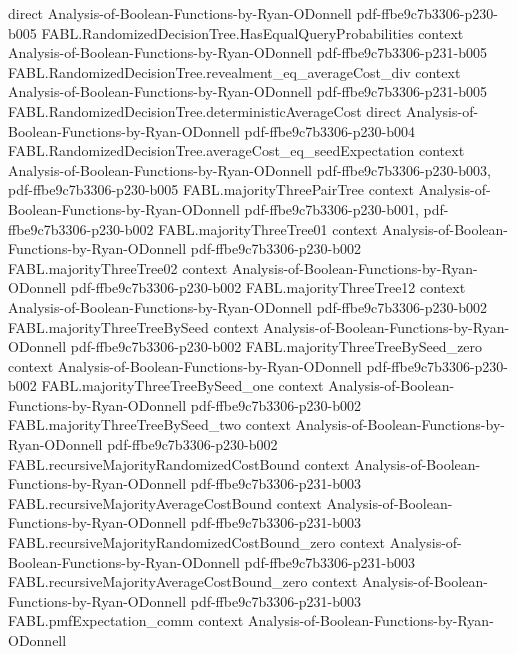 \begin{theorem}
  {direct}
  {Analysis-of-Boolean-Functions-by-Ryan-ODonnell}
  {pdf-ffbe9c7b3306-p230-b005}
\proofstep
  {FABL.RandomizedDecisionTree.HasEqualQueryProbabilities}
  {context}
  {Analysis-of-Boolean-Functions-by-Ryan-ODonnell}
  {pdf-ffbe9c7b3306-p231-b005}
\proofstep
  {FABL.RandomizedDecisionTree.revealment_eq_averageCost_div}
  {context}
  {Analysis-of-Boolean-Functions-by-Ryan-ODonnell}
  {pdf-ffbe9c7b3306-p231-b005}
\proofstep
  {FABL.RandomizedDecisionTree.deterministicAverageCost}
  {direct}
  {Analysis-of-Boolean-Functions-by-Ryan-ODonnell}
  {pdf-ffbe9c7b3306-p230-b004}
\proofstep
  {FABL.RandomizedDecisionTree.averageCost_eq_seedExpectation}
  {context}
  {Analysis-of-Boolean-Functions-by-Ryan-ODonnell}
  {pdf-ffbe9c7b3306-p230-b003,
    pdf-ffbe9c7b3306-p230-b005}
\proofstep
  {FABL.majorityThreePairTree}
  {context}
  {Analysis-of-Boolean-Functions-by-Ryan-ODonnell}
  {pdf-ffbe9c7b3306-p230-b001,
    pdf-ffbe9c7b3306-p230-b002}
\proofstep
  {FABL.majorityThreeTree01}
  {context}
  {Analysis-of-Boolean-Functions-by-Ryan-ODonnell}
  {pdf-ffbe9c7b3306-p230-b002}
\proofstep
  {FABL.majorityThreeTree02}
  {context}
  {Analysis-of-Boolean-Functions-by-Ryan-ODonnell}
  {pdf-ffbe9c7b3306-p230-b002}
\proofstep
  {FABL.majorityThreeTree12}
  {context}
  {Analysis-of-Boolean-Functions-by-Ryan-ODonnell}
  {pdf-ffbe9c7b3306-p230-b002}
\proofstep
  {FABL.majorityThreeTreeBySeed}
  {context}
  {Analysis-of-Boolean-Functions-by-Ryan-ODonnell}
  {pdf-ffbe9c7b3306-p230-b002}
\proofstep
  {FABL.majorityThreeTreeBySeed_zero}
  {context}
  {Analysis-of-Boolean-Functions-by-Ryan-ODonnell}
  {pdf-ffbe9c7b3306-p230-b002}
\proofstep
  {FABL.majorityThreeTreeBySeed_one}
  {context}
  {Analysis-of-Boolean-Functions-by-Ryan-ODonnell}
  {pdf-ffbe9c7b3306-p230-b002}
\proofstep
  {FABL.majorityThreeTreeBySeed_two}
  {context}
  {Analysis-of-Boolean-Functions-by-Ryan-ODonnell}
  {pdf-ffbe9c7b3306-p230-b002}
\proofstep
  {FABL.recursiveMajorityRandomizedCostBound}
  {context}
  {Analysis-of-Boolean-Functions-by-Ryan-ODonnell}
  {pdf-ffbe9c7b3306-p231-b003}
\proofstep
  {FABL.recursiveMajorityAverageCostBound}
  {context}
  {Analysis-of-Boolean-Functions-by-Ryan-ODonnell}
  {pdf-ffbe9c7b3306-p231-b003}
\proofstep
  {FABL.recursiveMajorityRandomizedCostBound_zero}
  {context}
  {Analysis-of-Boolean-Functions-by-Ryan-ODonnell}
  {pdf-ffbe9c7b3306-p231-b003}
\proofstep
  {FABL.recursiveMajorityAverageCostBound_zero}
  {context}
  {Analysis-of-Boolean-Functions-by-Ryan-ODonnell}
  {pdf-ffbe9c7b3306-p231-b003}
\proofstep
  {FABL.pmfExpectation_comm}
  {context}
  {Analysis-of-Boolean-Functions-by-Ryan-ODonnell}

\end{theorem}
